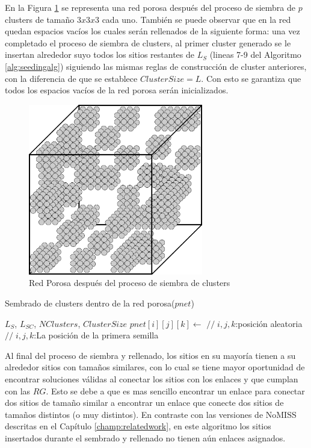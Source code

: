 En la Figura \ref{fig:cluster1} se representa una red porosa después del proceso de siembra de $p$ clusters de tamaño $3x3x3$ cada uno.
También se puede observar que en la red quedan espacios vacíos  los cuales serán rellenados de la siguiente forma: una vez completado
el proceso de siembra de clusters, al primer cluster generado se le insertan alrededor suyo todos los sitios restantes de $L_S$ 
(lineas 7-9 del Algoritmo \ref{alg:seedingalg}) siguiendo las mismas reglas de construcción de cluster anteriores, con la diferencia 
de que se establece $ClusterSize=L$. Con esto se garantiza que todos los espacios vacíos de la red porosa ser\'an inicializados.\\

\begin{figure}[h]
\centering
\includegraphics[width=3.0in]{img/cluster1.pdf}
\caption{Red Porosa después del proceso de siembra de clusters}
\label{fig:cluster1}
\end{figure}

\begin{algorithm}
\caption{Sembrado de clusters dentro de la red porosa($pnet$)}\label{alg:seedingalg}
\begin{algorithmic}[1]
\Require $L_S$, $L_{SC}$, $NClusters$, $ClusterSize$ 
\State $pnet[i][j][k] \gets $  {$//\;i,j,k$:posición aleatoria}
\State {}
\EndFor
\EndFor
{} {$//\;i,j,k$:La posición de la primera semilla}
	\State {}
\EndWhile
\end{algorithmic}
\end{algorithm}

Al final del proceso de siembra y rellenado, los sitios en su mayoría tienen a su alrededor sitios con tamaños similares, con lo cual se 
tiene mayor oportunidad de encontrar soluciones válidas al conectar los sitios con los enlaces y que cumplan con las $RG$. Esto se debe a 
que es mas sencillo encontrar un enlace para conectar dos sitios de tamaño similar a encontrar un enlace que conecte dos sitios de tamaños 
distintos (o muy distintos). En contraste con las versiones de NoMISS descritas en el Capítulo \ref{champ:relatedwork}, en este algoritmo
los sitios insertados durante el sembrado y rellenado no tienen aún enlaces asignados.\\

